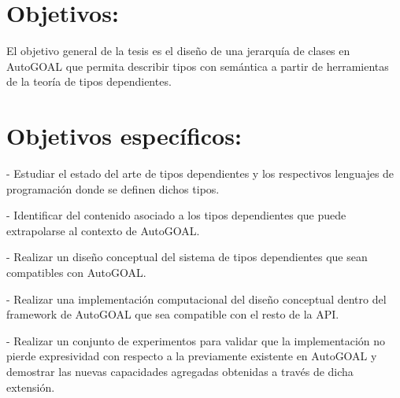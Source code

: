 \section{Objetivos:}

El objetivo general de la tesis es el diseño de una jerarquía de clases en AutoGOAL que permita describir tipos con semántica a partir de herramientas de la teoría de tipos dependientes. 

\section{Objetivos específicos:}

- Estudiar el estado del arte de tipos dependientes y los respectivos lenguajes de programación donde se definen dichos tipos. \vspace{0.25cm}


- Identificar del contenido asociado a los tipos dependientes que puede extrapolarse al contexto de AutoGOAL.\vspace{0.25cm}


- Realizar un diseño conceptual del sistema de tipos dependientes que sean compatibles con AutoGOAL.\vspace{0.25cm}


- Realizar una implementación computacional del diseño conceptual dentro del framework de AutoGOAL que sea compatible con el resto de la API.\vspace{0.25cm}


- Realizar un conjunto de experimentos para validar que la implementación no pierde expresividad con respecto a la previamente existente en AutoGOAL y demostrar las nuevas capacidades agregadas obtenidas a través de dicha extensión.\vspace{0.25cm}





